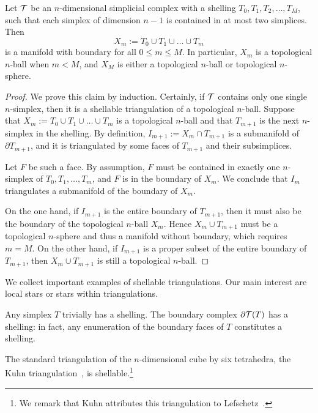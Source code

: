 \documentclass[10pt,letterpaper]{article}
\begin{document}
\begin{lemma}    
    Let ${\mathcal T}$ be an $n$-dimensional simplicial complex 
    with a shelling $T_{0}, T_{1}, T_{2}, \dots, T_{M}$,
    such that each simplex of dimension $n-1$ is contained in at most two simplices. 
    Then
    $$
        X_{m} := T_{0} \cup T_{1} \cup \dots \cup T_{m}
    $$ 
    is a manifold with boundary for all $0 \leq m \leq M$.
    In particular, $X_{m}$ is a topological $n$-ball when $m < M$, 
    and 
    $X_{M}$ is either a topological $n$-ball or topological $n$-sphere. 
\end{lemma}
\begin{proof}  
    We prove this claim by induction. 
    Certainly, if ${\mathcal T}$ contains only one single $n$-simplex, then it is a shellable triangulation of a topological $n$-ball. 
    Suppose that $X_m := T_{0} \cup T_{1} \cup \dots \cup T_{m}$ is a topological $n$-ball and that $T_{m+1}$ is the next $n$-simplex in the shelling.
    By definition, $I_{m+1} := X_{m} \cap T_{m+1}$ is a submanifold of $\partial T_{m+1}$,
    and it is triangulated by some faces of $T_{m+1}$ and their subsimplices. 
    
    Let $F$ be such a face. 
    By assumption, $F$ must be contained in exactly one $n$-simplex of $T_{0}, T_{1}, \dots, T_{m}$,
    and $F$ is in the boundary of $X_{m}$. We conclude that $I_{m}$ triangulates a submanifold of the boundary of $X_{m}$.
    
    On the one hand, 
    if $I_{m+1}$ is the entire boundary of $T_{m+1}$, 
    then it must also be the boundary of the topological $n$-ball $X_{m}$. 
    Hence $X_{m} \cup T_{m+1}$ must be a topological $n$-sphere and thus a manifold without boundary, which requires $m = M$.
    On the other hand, 
    if $I_{m+1}$ is a proper subset of the entire boundary of $T_{m+1}$, 
    then $X_{m} \cup T_{m+1}$ is still a topological $n$-ball.
\end{proof}






We collect important examples of shellable triangulations.
Our main interest are local stars or stars within triangulations. 

\begin{example}
    Any simplex $T$ trivially has a shelling. The boundary complex $\partial {\mathcal T}(T)$ has a shelling:
    in fact, any enumeration of the boundary faces of $T$ constitutes a shelling.
\end{example}
\begin{example}
    The standard triangulation of the $n$-dimensional cube by six tetrahedra, the Kuhn triangulation~\cite{kuhn1960some}, is shellable.\footnote{We remark that Kuhn attributes this triangulation to Lefschetz~\cite{lefschetz2015introduction}.}
\end{example}
\end{document}
